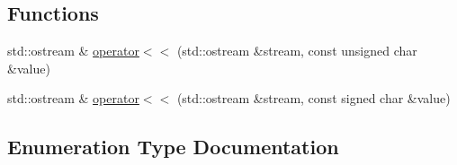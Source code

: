 \subsection*{Functions}
\begin{DoxyCompactItemize}
\item 
std\+::ostream \& \hyperlink{namespaceuva_1_1utils_1_1logging_ad1377b19aa409e93a549c8ed70bc3884}{operator$<$$<$} (std\+::ostream \&stream, const unsigned char \&value)
\item 
std\+::ostream \& \hyperlink{namespaceuva_1_1utils_1_1logging_a474ae73eb584975dd16f1e11df47d84a}{operator$<$$<$} (std\+::ostream \&stream, const signed char \&value)
\end{DoxyCompactItemize}


\subsection{Enumeration Type Documentation}
\hypertarget{namespaceuva_1_1utils_1_1logging_ab570eadc941242827b7432ab5b7d9053}{}
